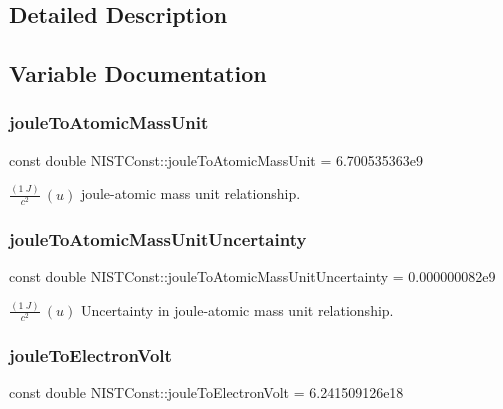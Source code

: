 \subsection{Detailed Description}


\subsection{Variable Documentation}
\mbox{\label{group___joule_ga6a8cba6b834ee62ab61671208b1ae9ee}} 
\subsubsection{\texorpdfstring{joule\+To\+Atomic\+Mass\+Unit}{jouleToAtomicMassUnit}}
{\footnotesize\ttfamily const double N\+I\+S\+T\+Const\+::joule\+To\+Atomic\+Mass\+Unit = 6.\+700535363e9}

$\frac{(1\ J)}{c^2} \ (u)$ joule-\/atomic mass unit relationship. \mbox{\label{group___joule_ga0fcd1cd8572c48695fadec809a5a1225}} 
\subsubsection{\texorpdfstring{joule\+To\+Atomic\+Mass\+Unit\+Uncertainty}{jouleToAtomicMassUnitUncertainty}}
{\footnotesize\ttfamily const double N\+I\+S\+T\+Const\+::joule\+To\+Atomic\+Mass\+Unit\+Uncertainty = 0.\+000000082e9}

$\frac{(1\ J)}{c^2} \ (u)$ Uncertainty in joule-\/atomic mass unit relationship. \mbox{\label{group___joule_ga08ffcdfd701ba898a91b0cbdde4d0e2d}} 
\subsubsection{\texorpdfstring{joule\+To\+Electron\+Volt}{jouleToElectronVolt}}
{\footnotesize\ttfamily const double N\+I\+S\+T\+Const\+::joule\+To\+Electron\+Volt = 6.\+241509126e18}

